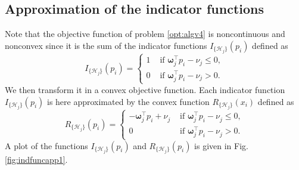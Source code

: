 \documentclass[twocolumn]{autart}
\begin{document}
\subsection{Approximation of the indicator functions}
Note that the objective function of problem \eqref{opt:algv4} is noncontinuous and nonconvex since it is the sum of the indicator functions $I_{\{\mathcal{H}_j\}}(p_i)$ defined as
\begin{equation}
I_{\{\mathcal{H}_j\}}(p_i) = \left\{\begin{array}{lll}
                                    1 & \mbox{ if } \boldsymbol{\omega}_j^\top p_i-\nu_j \leq 0,\\
                                    0 & \mbox{ if } \boldsymbol{\omega}_j^\top p_i-\nu_j > 0.
                                  \end{array}
\right.
\end{equation}
We then transform it in a convex objective function. Each indicator function $I_{\{\mathcal{H}_j\}}(p_i)$ is here approximated by the convex function $R_{\{\mathcal{H}_j\}}(x_i)$ defined as
\begin{equation}
R_{\{\mathcal{H}_j\}}(p_i) = \left\{\begin{array}{lll}
                                    -\boldsymbol{\omega}_j^\top p_i+\nu_j^{} & \mbox{ if }\boldsymbol{\omega}_j^\top p_i-\nu_j^{} \leq 0,\\
                                    0 & \mbox{ if } \boldsymbol{\omega}_j^\top p_i-\nu_j^{} > 0.
                                  \end{array}
\right.
\end{equation}
A plot of the functions $I_{\{\mathcal{H}_j\}}(p_i)$ and $R_{\{\mathcal{H}_j\}}(p_i)$ is given in Fig. \ref{fig:indfuncapp1}.
\end{document}
